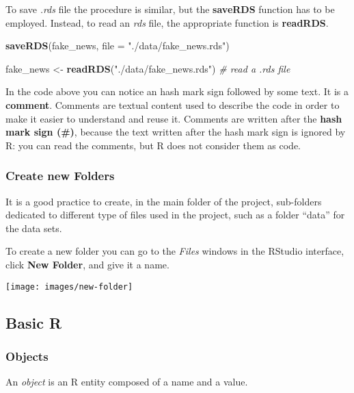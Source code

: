 \documentclass[
]{article}
\newenvironment{Shaded}{\begin{snugshade}}{\end{snugshade}}
\newcommand{\AttributeTok}[1]{\textcolor[rgb]{0.13,0.29,0.53}{#1}}
\newcommand{\CommentTok}[1]{\textcolor[rgb]{0.56,0.35,0.01}{\textit{#1}}}
\newcommand{\FunctionTok}[1]{\textcolor[rgb]{0.13,0.29,0.53}{\textbf{#1}}}
\newcommand{\NormalTok}[1]{#1}
\newcommand{\OtherTok}[1]{\textcolor[rgb]{0.56,0.35,0.01}{#1}}
\newcommand{\StringTok}[1]{\textcolor[rgb]{0.31,0.60,0.02}{#1}}
\begin{document}
To save \emph{.rds} file the procedure is similar, but the \textbf{saveRDS} function has to be employed. Instead, to read an \emph{rds} file, the appropriate function is \textbf{readRDS}.

\begin{Shaded}
\begin{Highlighting}[]
\FunctionTok{saveRDS}\NormalTok{(fake\_news, }\AttributeTok{file =} \StringTok{"./data/fake\_news.rds"}\NormalTok{)}

\NormalTok{fake\_news }\OtherTok{\textless{}{-}} \FunctionTok{readRDS}\NormalTok{(}\StringTok{"./data/fake\_news.rds"}\NormalTok{)   }\CommentTok{\# read a .rds file}
\end{Highlighting}
\end{Shaded}

In the code above you can notice an hash mark sign followed by some text. It is a \textbf{comment}. Comments are textual content used to describe the code in order to make it easier to understand and reuse it. Comments are written after the \textbf{hash mark sign (\#)}, because the text written after the hash mark sign is ignored by R: you can read the comments, but R does not consider them as code.

\subsubsection{Create new Folders}\label{create-new-folders}

It is a good practice to create, in the main folder of the project, sub-folders dedicated to different type of files used in the project, such as a folder ``data'' for the data sets.

To create a new folder you can go to the \emph{Files} windows in the RStudio interface, click \textbf{New Folder}, and give it a name.

\texttt{[image: images/new-folder]}

\subsection{Basic R}\label{basic-r}

\subsubsection{Objects}\label{objects}

An \emph{object} is an R entity composed of a name and a value.
\end{document}
